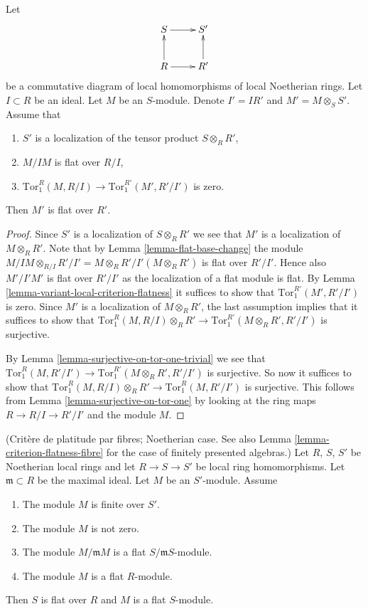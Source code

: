 \begin{lemma}
\label{lemma-another-variant-local-criterion-flatness}
Let
$$
\xymatrix{
S \ar[r] & S' \\
R \ar[r] \ar[u] & R' \ar[u]
}
$$
be a commutative diagram of local homomorphisms of local Noetherian rings.
Let $I \subset R$ be an ideal.
Let $M$ be an $S$-module.
Denote $I' = IR'$ and $M' = M\otimes_S S'$.
Assume that
\begin{enumerate}
\item $S'$ is a localization of the tensor product
$S \otimes_R R'$,
\item $M/IM$ is flat over $R/I$,
\item $\text{Tor}_1^R(M, R/I) \to \text{Tor}_1^{R'}(M', R'/I')$
is zero.
\end{enumerate}
Then $M'$ is flat over $R'$.
\end{lemma}

\begin{proof}
Since $S'$ is a localization of $S \otimes_R R'$ we see that
$M'$ is a localization of $M \otimes_R R'$. Note that
by Lemma \ref{lemma-flat-base-change} the module $M/IM \otimes_{R/I} R'/I'
= M \otimes_R R' /I'(M \otimes_R R')$ is flat over $R'/I'$. Hence also
$M'/I'M'$ is flat over $R'/I'$ as the localization of a flat module
is flat. By Lemma \ref{lemma-variant-local-criterion-flatness}
it suffices to show that $\text{Tor}_1^{R'}(M', R'/I')$ is zero.
Since $M'$ is a localization of $M \otimes_R R'$, the last assumption
implies that it suffices to show that
$\text{Tor}_1^R(M, R/I) \otimes_R R'
\to
\text{Tor}_1^{R'}(M \otimes_R R', R'/I')$
is surjective.

\medskip\noindent
By Lemma \ref{lemma-surjective-on-tor-one-trivial} we see that
$\text{Tor}_1^R(M, R'/I') \to \text{Tor}_1^{R'}(M\otimes_R R', R'/I')$
is surjective. So now it suffices to show that
$\text{Tor}_1^R(M, R/I) \otimes_R R'
\to
\text{Tor}_1^R(M, R'/I')$
is surjective. This follows from Lemma \ref{lemma-surjective-on-tor-one}
by looking at the ring maps $R \to R/I \to R'/I'$ and the module $M$.
\end{proof}

\begin{lemma}
\label{lemma-criterion-flatness-fibre-Noetherian}
(Crit\`ere de platitude par fibres; Noetherian case.
See also Lemma \ref{lemma-criterion-flatness-fibre}
for the case of finitely presented algebras.)
Let $R$, $S$, $S'$ be Noetherian local rings and let $R \to S \to S'$
be local ring homomorphisms. Let $\mathfrak m \subset R$ be the
maximal ideal. Let $M$ be an $S'$-module. Assume
\begin{enumerate}
\item The module $M$ is finite over $S'$.
\item The module $M$ is not zero.
\item The module $M/\mathfrak m M$
is a flat $S/\mathfrak m S$-module.
\item The module $M$ is a flat $R$-module.
\end{enumerate}
Then $S$ is flat over $R$ and $M$ is a flat $S$-module.
\end{lemma}

